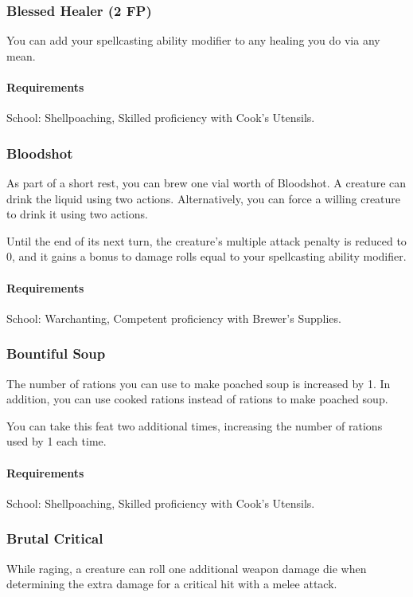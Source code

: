 \subsubsection{Blessed Healer (2 FP)} \label{feat::blessedhealer}
    You can add your spellcasting ability modifier to any healing you do via any mean.
    \paragraph{Requirements} School: Shellpoaching, Skilled proficiency with Cook's Utensils.
\subsubsection{Bloodshot} \label{feat::bloodshot}
    As part of a short rest, you can brew one vial worth of Bloodshot.
    A creature can drink the liquid using two actions.
    Alternatively, you can force a willing creature to drink it using two actions.

    Until the end of its next turn, the creature's multiple attack penalty is reduced to 0, and it gains a bonus to damage rolls equal to your spellcasting ability modifier.
    \paragraph{Requirements} School: Warchanting, Competent proficiency with Brewer's Supplies.
\subsubsection{Bountiful Soup} \label{feat::bountifulsoup}
    The number of rations you can use to make poached soup is increased by 1.
    In addition, you can use cooked rations instead of rations to make poached soup.

    You can take this feat two additional times, increasing the number of rations used by 1 each time.
    \paragraph{Requirements} School: Shellpoaching, Skilled proficiency with Cook's Utensils.
\subsubsection{Brutal Critical} \label{feat::brutalcritical}
    While raging, a creature can roll one additional weapon damage die when determining the extra damage for a critical hit with a melee attack.

